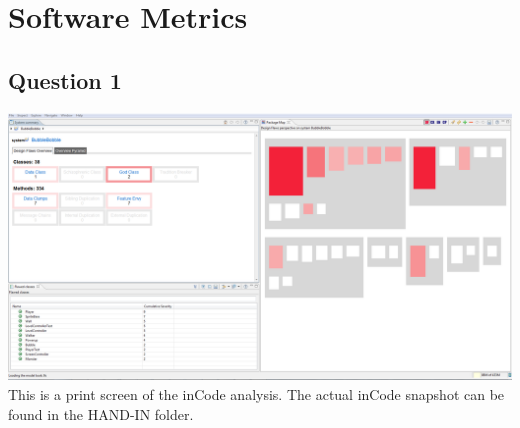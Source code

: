 \chapter{Software Metrics}

\section{Question 1}

\includegraphics[width=150mm]{inCode.png}\\[0.5cm]

This is a print screen of the inCode analysis. The actual inCode snapshot can be found in the HAND-IN folder. 